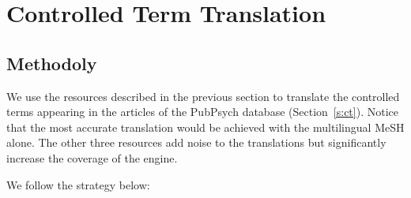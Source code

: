 \documentclass[a4paper,11pt]{article}
\begin{document}
	
	\section{Controlled Term Translation}
	\label{s:cttrad}
	
	\subsection{Methodoly}
	We use the resources described in the previous section to translate the controlled terms appearing in the articles of the PubPsych database (Section~\ref{s:ct}).
	Notice that the most accurate translation would be achieved with the multilingual MeSH alone. The other three resources add noise to the translations but significantly increase the coverage of the engine.
	
	\bigskip
	\noindent
	We follow the strategy below:
\end{document}
